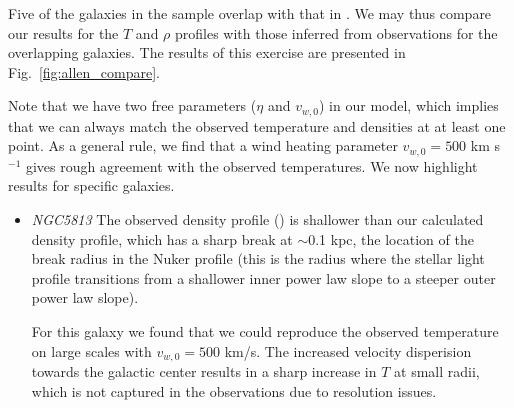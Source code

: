 \documentclass[usenatbib,fleqn]{mn2e}
\newcommand{\vwO}{v_{w,0}}
\begin{document}
Five of the galaxies in the \citet{AllenDunn+:2006a} sample overlap with that in .  We may thus compare our results for the $T$ and $\rho$ profiles with those inferred from observations for the overlapping galaxies.  The results of this exercise are presented in Fig.~\ref{fig:allen_compare}.

Note that we have two free parameters ($\eta$ and $\vwO$) in our
model, which implies that we can always match the observed temperature
and densities at at least one point.  As a general rule, we find that
a wind heating parameter $\vwO=500$ km s$^{-1}$ gives rough agreement
with the observed temperatures.  We now highlight results for specific
galaxies.

\begin{itemize}


\item \emph{NGC5813} %
  The observed density profile (\citealt{RussellMcNamara+:2013a}) is
  shallower than our calculated density profile, which has a sharp
  break at $\sim$0.1 kpc, the location of the break radius in the
  Nuker profile (this is the radius where the stellar light profile
  transitions from a shallower inner power law slope to a steeper
  outer power law slope).

  For this galaxy we found that we could reproduce the observed
  temperature on large scales with $\vwO=500$ km/s. The increased
  velocity disperision towards the galactic center results in a sharp
  increase in $T$ at small radii, which is not captured in the
  observations due to resolution issues.
\end{itemize}
\end{document}
